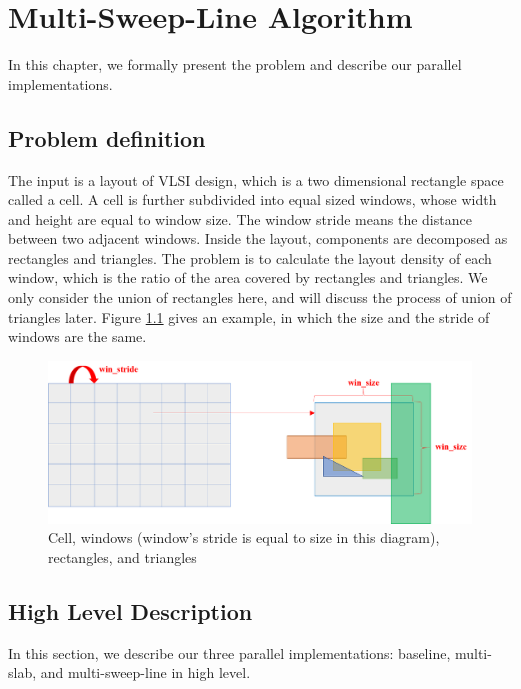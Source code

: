 \chapter{Multi-Sweep-Line Algorithm}
\label{chap:methodology}
In this chapter, we formally present the problem and describe our parallel implementations. 


\section{Problem definition}
The input is a layout of VLSI design, which is a two dimensional rectangle space called a cell.  A cell is further subdivided into equal sized windows, whose width and height are equal to window size.  The window stride means the distance between two adjacent windows.  Inside the layout, components are decomposed as rectangles and triangles. The problem is to calculate the layout density of each window, which is the ratio of the area covered by rectangles and triangles. We only consider the union of rectangles here, and will discuss the process of union of triangles later.  Figure \ref{fig:fig_3_1} gives an example, in which the size and the stride of windows are the same.

\begin{figure}[!h]
    \centering
    \includegraphics[scale=0.4]{image/fig_3_1}
    \caption{Cell, windows (window's stride is equal to size in this diagram), rectangles, and triangles}
    \label{fig:fig_3_1}
\end{figure}

\section{High Level Description}
In this section, we describe our three parallel implementations: baseline, multi-slab, and multi-sweep-line in high level.

